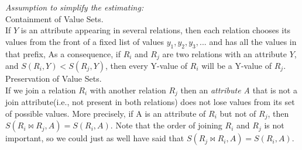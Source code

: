 \begin{enumerate}
\begin{enumerate}
\begin{enumerate}
\begin{enumerate}
     {\it Assumption to simplify the estimating:}\\

       Containment of Value Sets. \\
       If $Y$ is an attribute appearing in several relations, then each relation chooses its values from the front of a fixed list of values $y_1, y_2, y_3, ...$ and has all the values in that prefix, As a consequence, if $R_i$ and $R_j$ are two relations with an attribute $Y$, and $S(R_i,Y) < S(R_j, Y)$, then every Y-value of $R_i$ will be a Y-value of $R_j$.\\

       Preservation of Value Sets. \\
       If we join a relation $R_i$ with another relation $R_j$ then an {\it attribute A} that is not a join attribute(i.e., not present in both relations) does not lose values from its set of possible values. More precisely, if A is an attribute of $R_i$ but not of $R_j$, then $S(R_i \Join R_j, A) = S(R_i, A)$. Note that the order of joining $R_i$ and $R_j$ is not important, so we could just as well have said that $S(R_j \Join R_i, A) = S(R_i, A)$.


\end{enumerate}
\end{enumerate}
\end{enumerate}
\end{enumerate}
